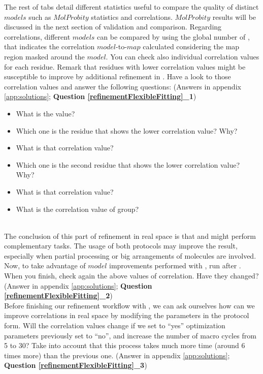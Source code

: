   The rest of tabs detail different statistics useful to compare the quality of distinct $models$ such as $MolProbity$ statistics and  correlations. $MolProbity$ results will be discussed in the next section of validation and comparison. Regarding  correlations, different $models$ can be compared by using the global number of \ccmask, that indicates the correlation $model$-to-$map$ calculated considering the map region masked around the $model$. You can check also individual correlation values for each residue.  Remark that residues with lower correlation values might be susceptible to improve by additional refinement in \coot. Have a look to those correlation values and answer the following questions: (Answers in appendix \ref{app:solutions}; \textbf{Question \ref{refinementFlexibleFitting}\_1}) \\
  
  \begin{minipage}{\linewidth}
  \begin{framed}
  \begin{itemize}
  \item What is the \ccmask value?
  \item Which one is the residue that shows the lower correlation value? Why?
  \item What is that correlation value?
  \item Which one is the second residue that shows the lower correlation value? Why?
  \item What is that correlation value?
  \item What is the correlation value of  group?
  \end{itemize}
  \end{framed}
  \end{minipage}\\
  
  The conclusion of this part of refinement in real space is that \coot and \phenix {} might perform complementary tasks. The usage of both protocols may improve the result, especially when partial processing or big arrangements of molecules are involved. Now, to take advantage of $model$ improvements performed with \coot, run \phenix {} after \coot. When you finish, check again the above values of correlation. Have they changed? (Answer in appendix \ref{app:solutions}; \textbf{Question \ref{refinementFlexibleFitting}\_2})\\
  
  Before finishing our refinement workflow with , we can ask ourselves how can we improve correlations in real space by modifying the  parameters in the protocol form. Will the correlation values change if we set to ``yes'' optimization parameters previously set to ``no'', and increase the number of macro cycles from 5 to 30? Take into account that this process takes much more time (around 6 times more) than the previous one. (Answer in appendix \ref{app:solutions}; \textbf{Question \ref{refinementFlexibleFitting}\_3})\\
  
